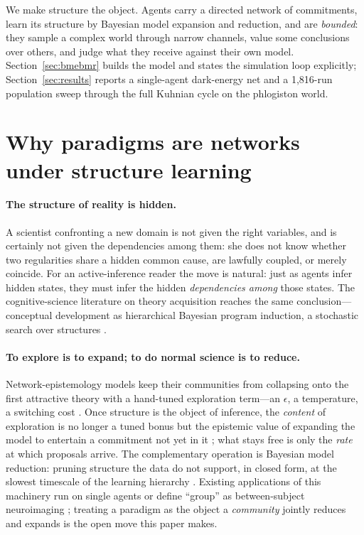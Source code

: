 \documentclass[11pt]{article}
\begin{document}
We make structure the object. Agents carry a directed network of commitments, learn its structure by
Bayesian model expansion and reduction, and are \emph{bounded}: they sample a complex world through
narrow channels, value some conclusions over others, and judge what they receive against their own
model. Section~\ref{sec:bmebmr} builds the model and states the simulation loop explicitly;
Section~\ref{sec:results} reports a single-agent dark-energy net and a 1{,}816-run population sweep
through the full Kuhnian cycle on the phlogiston world.

\section{Why paradigms are networks under structure learning}
\label{sec:hidden}

\paragraph{The structure of reality is hidden.}
A scientist confronting a new domain is not given the right variables, and is certainly not given the
dependencies among them: she does not know whether two regularities share a hidden common cause, are
lawfully coupled, or merely coincide. For an active-inference reader the move is natural: just as
agents infer hidden states, they must infer the hidden \emph{dependencies among} those states. The
cognitive-science literature on theory acquisition reaches the same conclusion---conceptual
development as hierarchical Bayesian program induction, a stochastic search over structures
\citep{ullman2020,kemp2008form,ullman2012}.

\paragraph{To explore is to expand; to do normal science is to reduce.}
Network-epistemology models keep their communities from collapsing onto the first attractive theory
with a hand-tuned exploration term---an $\epsilon$, a temperature, a switching cost
\citep{zollman2010,oconnor2019}. Once structure is the object of inference, the \emph{content} of
exploration is no longer a tuned bonus but the epistemic value of expanding the model to entertain a
commitment not yet in it \citep{friston2015,friston2017curiosity}; what stays free is only the
\emph{rate} at which proposals arrive. The complementary operation is Bayesian model reduction:
pruning structure the data do not support, in closed form, at the slowest timescale of the learning
hierarchy \citep{friston2018bmr,smith2022plos}. Existing applications of this machinery run on single
agents \citep{smith2022plos,priorelli2023} or define ``group'' as between-subject neuroimaging
\citep{friston2016peb}; treating a paradigm as the object a \emph{community} jointly reduces and
expands is the open move this paper makes.
\end{document}
